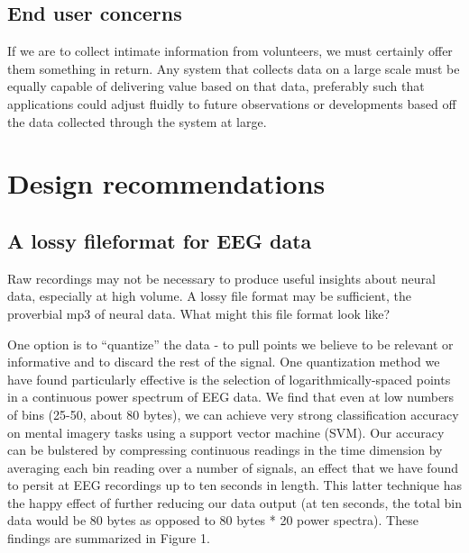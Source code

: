 \documentclass[a4paper,twoside]{article}
\begin{document}
\subsection{End user concerns}

If we are to collect intimate information from volunteers, we must certainly offer them something in return. Any system that collects data on a large scale must be equally capable of delivering value based on that data, preferably such that applications could adjust fluidly to future observations or developments based off the data collected through the system at large. 






\section{Design recommendations}

\subsection{A lossy fileformat for EEG data}
Raw recordings may not be necessary to produce useful insights about neural data, especially at high volume. A lossy file format may be sufficient, the proverbial mp3 of neural data. What might this file format look like?

One option is to ``quantize'' the data - to pull points we believe to be relevant or informative and to discard the rest of the signal. One quantization method we have found particularly effective is the selection of logarithmically-spaced points in a continuous power spectrum of EEG data. We find that even at low numbers of bins (25-50, about 80 bytes), we can achieve very strong classification accuracy on mental imagery tasks using a support vector machine (SVM). Our accuracy can be bulstered by compressing continuous readings in the time dimension by averaging each bin reading over a number of signals, an effect that we have found to persit at EEG recordings up to ten seconds in length. This latter technique has the happy effect of further reducing our data output (at ten seconds, the total bin data would be 80 bytes as opposed to 80 bytes * 20 power spectra). These findings are summarized in Figure 1.
\end{document}
